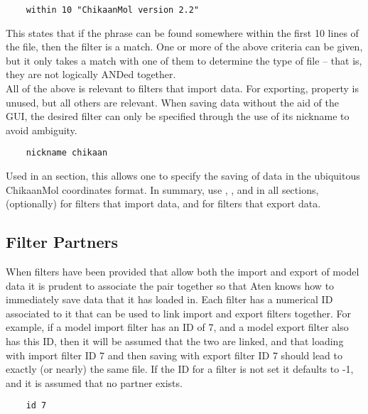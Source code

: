 \begin{verbatim}
	within 10 "ChikaanMol version 2.2"
\end{verbatim}

This states that if the phrase  can be found somewhere within the first 10 lines of the file, then the filter is a match. One or more of the above criteria can be given, but it only takes a match with one of them to determine the type of file -- that is, they are not logically ANDed together.\\

All of the above is relevant to filters that import data. For exporting,  property is unused, but all others are relevant. When saving data without the aid of the GUI, the desired filter can only be specified through the use of its nickname to avoid ambiguity.

\begin{verbatim}
	nickname chikaan
\end{verbatim}

Used in an  section, this allows one to specify the saving of data in the ubiquitous ChikaanMol coordinates format. In summary, use , , and  in all sections,  (optionally) for filters that import data, and  for filters that export data.

\subsection{Filter Partners}

When filters have been provided that allow both the import and export of model data it is prudent to associate the pair together so that Aten knows how to immediately save data that it has loaded in. Each filter has a numerical ID associated to it that can be used to link import and export filters together. For example, if a model import filter has an ID of 7, and a model export filter also has this ID, then it will be assumed that the two are linked, and that loading with import filter ID 7 and then saving with export filter ID 7 should lead to exactly (or nearly) the same file. If the ID for a filter is not set it defaults to -1, and it is assumed that no partner exists.\\

\begin{verbatim}
	id 7
\end{verbatim}

